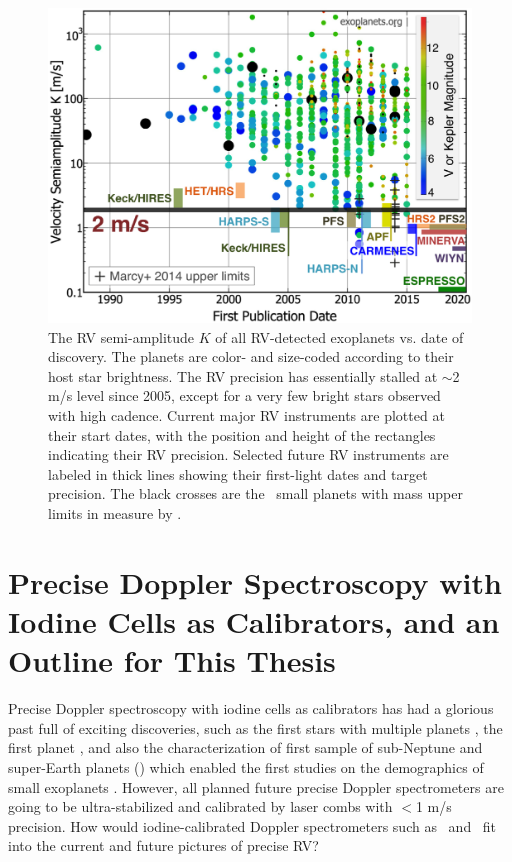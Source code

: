 \begin{figure}
\centering
\includegraphics[scale=0.32]{introduction/family-big-carmenes.eps}
\caption{The RV semi-amplitude $K$ of all RV-detected exoplanets
  vs. date of discovery. The planets are color- and size-coded according
  to their host star brightness. The RV precision has essentially
  stalled at $\sim$2 m/s level since 2005, except for a very few bright
  stars observed with high cadence. Current major RV instruments are
  plotted at their start dates, with the position and height of the
  rectangles indicating their RV precision. Selected future RV
  instruments are labeled in thick lines showing their first-light dates
  and target precision. The black crosses are the \kepler\ small planets
  with mass upper limits in \cite{marcy2014} measure by \keck.
\label{intro:fig:family}}
\end{figure}



\section{Precise Doppler Spectroscopy with Iodine Cells as
  Calibrators, and an Outline for This Thesis} 

Precise Doppler spectroscopy with iodine cells as calibrators has had
a glorious past full of exciting discoveries, such as the first stars
with multiple planets \citep{butler1999}, the first 
planet \cite{howard2013, pepe2013}, and also the characterization of
first sample of sub-Neptune and super-Earth planets
(\citealt{marcy2014}) which enabled the first studies on the
demographics of small exoplanets \citep{wu2013, weiss2014, rogers2015,
wolfgang2015a, wolfgang2015b}. However, all planned future precise Doppler
spectrometers are going to be ultra-stabilized and calibrated by laser
combs with $<$1 m/s precision. How would iodine-calibrated Doppler
spectrometers such as \het\ and \keck\ fit into the current and future
pictures of precise RV?

